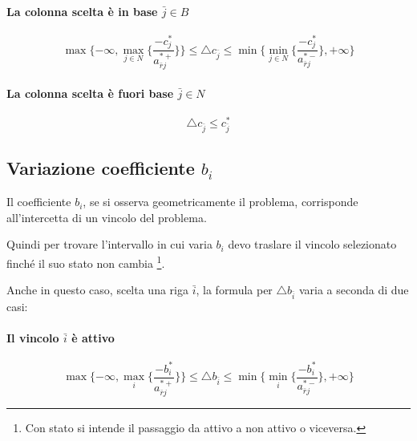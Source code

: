 \paragraph{La colonna scelta è in base $\bar{j} \in B$}

\begin{equation} \label{variazioneC}
	\max \lbrace- \infty, \max_{j \in N} \lbrace \frac{-c_j^*}{a_{\bar{r}j}^{*+}} \rbrace \rbrace \leq \triangle c_{\bar{j}} \leq \min \lbrace \min_{j \in N} \lbrace \frac{-c_j^*}{a_{\bar{r}j}^{*-}} \rbrace,+ \infty \rbrace
\end{equation}

\paragraph{La colonna scelta è fuori base $\bar{j} \in N$}

\begin{equation}
	\triangle c_{\bar{j}} \leq c_{\bar{j}}^*
\end{equation}



\subsection{Variazione coefficiente $b_i$}
Il coefficiente $b_i$, se si osserva geometricamente il problema, corrisponde all'intercetta di un vincolo del problema. 

Quindi per trovare l'intervallo in cui varia $b_i$ devo traslare il vincolo selezionato finché il suo stato non cambia \footnote{Con stato si intende il passaggio da attivo a non attivo o viceversa.}.

Anche in questo caso, scelta una riga $\bar{i}$, la formula per $\triangle b_{\bar{i}}$ varia a seconda di due casi:

\paragraph{Il vincolo $\bar{i}$ è attivo}

\begin{equation} \label{variazioneB}
	\max \lbrace- \infty, \max_i \lbrace \frac{-b_i^*}{a_{\bar{r}j}^{*+}} \rbrace \rbrace \leq \triangle b_{\bar{i}} \leq \min \lbrace \min_i \lbrace \frac{-b_i^*}{a_{\bar{r}j}^{*-}} \rbrace,+ \infty \rbrace
\end{equation}

